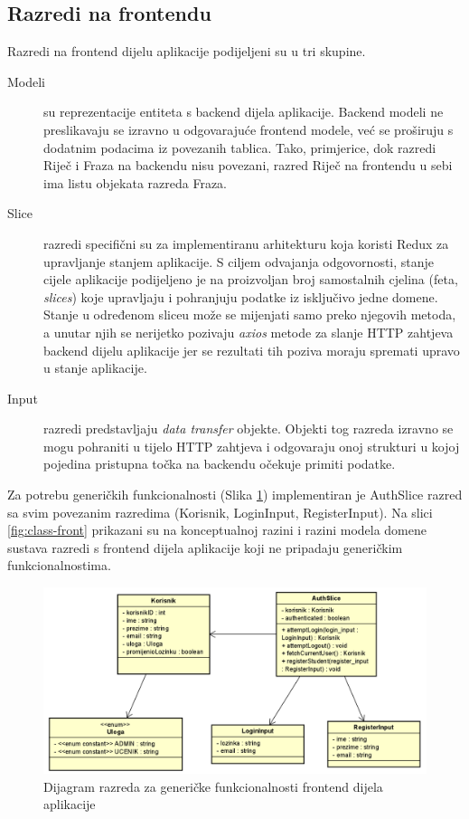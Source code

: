 \subsection{Razredi na frontendu}

Razredi na frontend dijelu aplikacije podijeljeni su u tri skupine.
\begin{description}
	\item[Modeli] su reprezentacije entiteta s backend dijela aplikacije. Backend modeli ne preslikavaju se izravno u odgovarajuće frontend modele, već se proširuju s dodatnim podacima iz povezanih tablica. Tako, primjerice, dok razredi Riječ i Fraza na backendu nisu povezani, razred Riječ na frontendu u sebi ima listu objekata razreda Fraza.
	\item[Slice] razredi specifični su za implementiranu arhitekturu koja koristi Redux za upravljanje stanjem aplikacije. S ciljem odvajanja odgovornosti, stanje cijele aplikacije podijeljeno je na proizvoljan broj samostalnih cjelina (feta, \textit{slices}) koje upravljaju i pohranjuju podatke iz isključivo jedne domene. Stanje u određenom sliceu može se mijenjati samo preko njegovih metoda, a unutar njih se nerijetko pozivaju \textit{axios} metode za slanje HTTP zahtjeva backend dijelu aplikacije jer se rezultati tih poziva moraju spremati upravo u stanje aplikacije.
	\item[Input] razredi predstavljaju \textit{data transfer} objekte. Objekti tog razreda izravno se mogu pohraniti u tijelo HTTP zahtjeva i odgovaraju onoj strukturi u kojoj  pojedina pristupna točka na backendu očekuje primiti podatke.
\end{description}

Za potrebu generičkih funkcionalnosti (Slika \ref{fig:class-front-implemented}) implementiran je AuthSlice razred sa svim povezanim razredima (Korisnik, LoginInput, RegisterInput). Na slici \ref{fig:class-front} prikazani su na konceptualnoj razini i razini modela domene sustava razredi s frontend dijela aplikacije koji ne pripadaju generičkim funkcionalnostima.

\begin{figure}[htp]
	\includegraphics[scale=0.55]{dijagrami/class_front_implemented.png}
	\centering
	\caption{Dijagram razreda za generičke funkcionalnosti frontend dijela aplikacije}
	\label{fig:class-front-implemented}
\end{figure}

